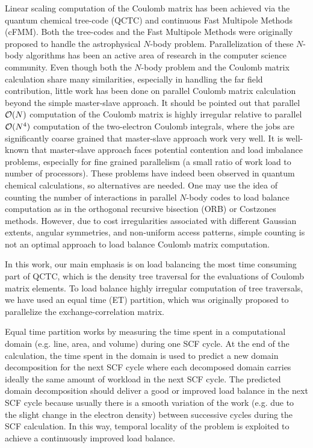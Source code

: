 \commentoutA{\documentclass[prl,aps,twocolumn,twocolumngrid,superbib]{revtex4}}
\begin{document}
Linear scaling computation of the Coulomb matrix has been achieved via
the quantum chemical tree-code
(QCTC)\cite{MChallacombe96,MChallacombe96B,MChallacombe97} and
continuous Fast Multipole Methods
(cFMM)\cite{CWhite94B,CWhite96A,MStrain96}.  Both the
tree-codes\cite{JBarnes86} and the Fast Multipole
Methods\cite{LGreengard87,CRAnderson92} were originally proposed to
handle the astrophysical $N$-body problem.  Parallelization of these
$N$-body algorithms has been an active area of research in the
computer science
community\cite{MWarren92,AGrama94,MWarren95b,Singh93,Singh_95v27,YHu96,Grama_98v24,PGibbon02,Antonuccio-Delogu03}.
Even though both the $N$-body problem and the Coulomb matrix
calculation share many similarities, especially in handling the far
field contribution, little work has been done on parallel Coulomb
matrix calculation beyond the simple master-slave
approach\cite{Sosa_98v19,Furlani_00v128,Sosa_00v26}.  It should be
pointed out that parallel ${\cal O}(N)$ computation of the Coulomb
matrix is highly irregular relative to parallel ${\cal O}(N^4)$
computation of the two-electron Coulomb integrals, where the jobs are
significantly coarse grained that master-slave approach work very
well.  It is well-known that master-slave approach faces potential
contention and load imbalance problems\cite{BWilkinson99,GWilson95},
especially for fine grained parallelism (a small ratio of work load to
number of processors).  These problems have indeed been observed in
quantum chemical calculations\cite{Guerra_95,CGan03}, so alternatives
are needed.  One may use the idea of counting the number of
interactions in parallel $N$-body codes to load balance computation as
in the orthogonal recursive bisection (ORB) or Costzones
methods\cite{MWarren95b,Singh93,Singh_95v27,MWarren93}.  However, due
to cost irregularities associated with different Gaussian extents,
angular symmetries, and non-uniform access patterns, simple counting
is not an optimal approach to load balance Coulomb matrix computation.

In this work, our main emphasis is on load balancing the most time
consuming part of QCTC, which is the density tree traversal for the
evaluations of Coulomb matrix elements. To load balance highly
irregular computation of tree traversals, we have used an equal time
(ET) partition\cite{CGan03}, which was originally proposed to
parallelize the exchange-correlation matrix.

Equal time partition works by measuring the time spent in a
computational domain (e.g. line, area, and volume) during one SCF
cycle. At the end of the calculation, the time spent in the domain is
used to predict a new domain decomposition for the next SCF cycle
where each decomposed domain carries ideally the same amount of
workload in the next SCF cycle. The predicted domain decomposition
should deliver a good or improved load balance in the next SCF cycle
because usually there is a smooth variation of the work (e.g. due to
the slight change in the electron density) between successive cycles
during the SCF calculation.  In this way, temporal
locality\cite{JPilkington96} of the problem is exploited to achieve a
continuously improved load balance.
\end{document}
